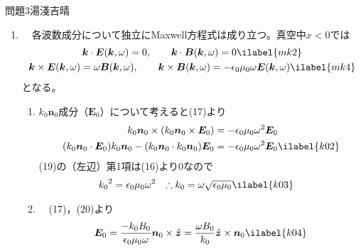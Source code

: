 \documentclass[fleqn]{jbook}
\begin{document}
\begin{answer}{問題3}{湯淺吉晴}
\begin{enumerate}
\begin{enumerate}
\item 
\begin{equation}
\epsilon_0\nabla \cdot \boldsymbol{E} = \rho 
\ilabel{m0}
\end{equation}
(13)を(8)$\sim$(9)と同様にして$V$で積分すると
\begin{equation}
\epsilon_0E_{1,x}(0,\,y,\,z,\,t) - \epsilon_0\left[E_{0,x}(0,\,y,\,z,\,t) + E_{2,x}(0,\,y,\,z,\,t)\right] = \sigma (y,\,z,\,t)
\end{equation}
境界条件(11)より
\begin{equation}
\sigma (y,\,z,\,t) = (\epsilon_0 - \epsilon_1)E_{1,x}(0,\,y,\,z,\,t)
\end{equation}

\end{enumerate}

\item 　各波数成分について独立にMaxwell方程式は成り立つ。真空中$x < 0$では
\begin{gather}
\boldsymbol{k}\cdot \boldsymbol{E}(\boldsymbol{k},\omega) = 0,\qquad \boldsymbol{k}\cdot \boldsymbol{B}(\boldsymbol{k},\omega) = 0 \ilabel{mk2} \\
\boldsymbol{k}\times \boldsymbol{E}(\boldsymbol{k},\omega) = \omega\boldsymbol{B}(\boldsymbol{k},\omega),\qquad \boldsymbol{k}\times \boldsymbol{B}(\boldsymbol{k},\omega) = -\epsilon_0\mu_0\omega\boldsymbol{E}(\boldsymbol{k},\omega) \ilabel{mk4}
\end{gather}
となる。

\begin{enumerate}

\item $k_0\boldsymbol{n}_0$成分（$\boldsymbol{E}_0$）について考えると(17)より
\begin{align}
k_0\boldsymbol{n}_0 \times \left(k_0\boldsymbol{n}_0 \times \boldsymbol{E}_0\right) &= -\epsilon_0\mu_0{\omega}^2\boldsymbol{E}_0 \\
(k_0\boldsymbol{n}_0\cdot \boldsymbol{E}_0)k_0\boldsymbol{n}_0 - (k_0\boldsymbol{n}_0\cdot k_0\boldsymbol{n}_0)\boldsymbol{E}_0 &= -\epsilon_0\mu_0{\omega}^2\boldsymbol{E}_0 \ilabel{k02}
\end{align}
(19)の（左辺）第1項は(16)より0なので
\begin{align}
{k_0}^2 &= \epsilon_0\mu_0{\omega}^2 &
\therefore k_0 &= \omega\sqrt{\epsilon_0\mu_0} \ilabel{k03}
\end{align}

\item 　(17)，(20)より
\begin{equation}
\boldsymbol{E}_0 = \frac{- k_0B_0}{\epsilon_0\mu_0\omega}\boldsymbol{n}_0 \times \hat{\boldsymbol{z}} = \frac{\omega B_0}{k_0}\hat{\boldsymbol{z}}\times \boldsymbol{n}_0
\ilabel{k04}
\end{equation}
\end{enumerate}


\end{enumerate}
\end{answer}
\end{document}
